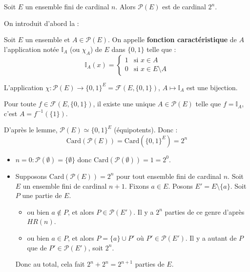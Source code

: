 \documentclass[a4paper,11pt]{article}
\newcommand{\mot}[1]{\textcolor{bordeaux}{\textbf{#1}}}
\begin{document}
\begin{proposition}
  Soit $E$ un ensemble fini de cardinal $n$. Alors $\mathcal{P}(E)$ est de cardinal $2^n$.
\end{proposition}

On introduit d'abord la :
\begin{definition}
  Soit $E$ un ensemble et $A \in \mathcal{P}(E)$. On appelle \mot{fonction caractéristique} de $A$ l'application notée $\mathbb{I}_A$ (ou $\chi_A$) de $E$ dans $\{0, 1\}$ telle que :
  $$ \mathbb{I}_A(x) = \begin{cases} 1 & \text{si } x \in A \\ 0 & \text{si } x \in E \setminus A \end{cases} $$
\end{definition}

\begin{lemme}
  L'application $\chi : \mathcal{P}(E) \to \{0, 1\}^E = \mathcal{F}(E, \{0, 1\})$, $A \mapsto \mathbb{I}_A$ est une bijection.
\end{lemme}

\begin{demonstration}
  Pour toute $f \in \mathcal{F}(E, \{0, 1\})$, il existe une unique $A \in \mathcal{P}(E)$ telle que $f = \mathbb{I}_A$, c'est $A = f^{-1}(\{1\})$.
\end{demonstration}

\begin{demonstration}
  D'après le lemme, $\mathcal{P}(E) \simeq \{0, 1\}^E$ (équipotents).
  Donc :
  $$ \text{Card}(\mathcal{P}(E)) = \text{Card}(\{0, 1\}^E) = 2^n $$
\end{demonstration}

\begin{remarque}
  \begin{itemize}
    \item $n=0 : \mathcal{P}(\emptyset) = \{\emptyset\}$ donc $\text{Card}(\mathcal{P}(\emptyset)) = 1 = 2^0$.
    \item Supposons $\text{Card}(\mathcal{P}(E)) = 2^n$ pour tout ensemble fini de cardinal $n$.
    Soit $E$ un ensemble fini de cardinal $n+1$. Fixons $a \in E$.
    Posons $E' = E \setminus \{a\}$.
    Soit $P$ une partie de $E$.
    \begin{itemize}
      \item ou bien $a \notin P$, et alors $P \in \mathcal{P}(E')$. Il y a $2^n$ parties de ce genre d'après $HR(n)$.
      \item ou bien $a \in P$, et alors $P = \{a\} \cup P'$ où $P' \in \mathcal{P}(E')$. Il y a autant de $P$ que de $P' \in \mathcal{P}(E')$, soit $2^n$.
    \end{itemize}
    Donc au total, cela fait $2^n + 2^n = 2^{n+1}$ parties de $E$.
  \end{itemize}
\end{remarque}
\end{document}
